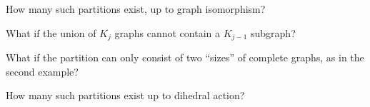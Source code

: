 \documentclass{article}
\begin{document}
\begin{question}
  How many such partitions exist, up to graph isomorphism?
\end{question}
\begin{related}
  \item What if the union of $K_j$ graphs cannot contain a $K_{j-1}$ subgraph?
  \item What if the partition can only consist of two ``sizes'' of complete
    graphs, as in the second example?
  \item How many such partitions exist up to dihedral action?
\end{related}
\end{document}
